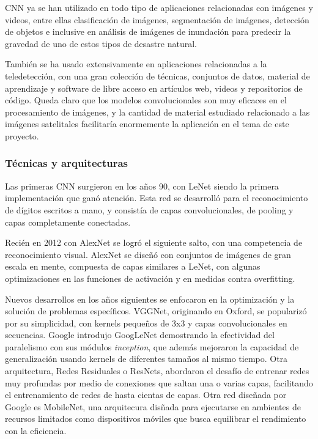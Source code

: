 CNN ya se han utilizado en todo tipo de aplicaciones relacionadas con imágenes y videos, entre ellas clasificación de
imágenes, segmentación de imágenes, detección de objetos e inclusive en análisis de imágenes de inundación para
predecir la gravedad de uno de estos tipos de desastre natural. \autocite{pally2022105285}

También se ha usado extensivamente en aplicaciones relacionadas a la teledetección, con una gran colección de técnicas,
conjuntos de datos, material de aprendizaje y software de libre acceso en artículos web, videos y repositorios de
código. \autocite{tds-landuse-classification} \autocite{repo-satellite-image-dl} Queda claro que los modelos
convolucionales son muy eficaces en el procesamiento de imágenes, y la cantidad de material estudiado relacionado a las
imágenes satelitales facilitaría enormemente la aplicación en el tema de este proyecto.

\subsubsection{Técnicas y arquitecturas}

Las primeras CNN surgieron en los años 90, con LeNet siendo la primera implementación que ganó atención. Esta red se
desarrolló para el reconocimiento de dígitos escritos a mano, y consistía de capas convolucionales, de pooling y capas
completamente conectadas.

Recién en 2012 con AlexNet se logró el siguiente salto, con una competencia de reconocimiento visual. AlexNet se diseñó
con conjuntos de imágenes de gran escala en mente, compuesta de capas similares a LeNet, con algunas optimizaciones en
las funciones de activación y en medidas contra overfitting.

Nuevos desarrollos en los años siguientes se enfocaron en la optimización y la solución de problemas específicos.
VGGNet, originando en Oxford, se popularizó por su simplicidad, con kernels pequeños de 3x3 y capas convolucionales en
secuencias. Google introdujo GoogLeNet demostrando la efectividad del paralelismo con sus módulos {\it inception}, que
además mejoraron la capacidad de generalización usando kernels de diferentes tamaños al mismo tiempo. Otra
arquitectura, Redes Residuales o ResNets, abordaron el desafío de entrenar redes muy profundas por medio de conexiones
que saltan una o varias capas, facilitando el entrenamiento de redes de hasta cientas de capas. Otra red diseñada por
Google es MobileNet, una arquitecura disñada para ejecutarse en ambientes de recursos limitados como dispositivos
móviles que busca equilibrar el rendimiento con la eficiencia.

